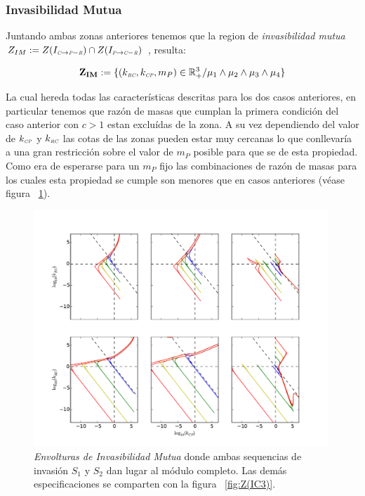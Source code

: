 \subsubsection{Invasibilidad Mutua}

Juntando ambas zonas anteriores tenemos que la region de \emph{invasibilidad mutua} $Z_{IM} := Z(I_{\textit{\tiny C} \to \textit{\tiny P}-\textit{\tiny R}}) \cap Z(I_{\textit{\tiny P} \to \textit{\tiny C}-\textit{\tiny R}})$ , resulta:

\begin{equation}
\mathbf{Z_{IM}} := \{ (k_{\textit{\tiny RC}},k_{\textit{\tiny CP}},m_P) \in \mathbb{R}^3_+ / \mu_1 \land \mu_2 \land \mu_3 \land \mu_4 \}
\end{equation}

La cual hereda todas las caracter\'isticas descritas para los dos casos anteriores, en particular tenemos que raz\'on de masas que cumplan la primera condici\'on del caso anterior con $c > 1$ estan exclu\'idas de la zona. A su vez dependiendo del valor de $k_{\textit{\tiny CP}}$ y $k_{\textit{\tiny RC}}$ las cotas de las zonas pueden estar muy cercanas lo que conllevar\'ia a una gran restricci\'on sobre el valor de $m_P$ posible para que se de esta propiedad. Como era de esperarse para un $m_P$ fijo las combinaciones de raz\'on de masas para los cuales esta propiedad se cumple son menores que en casos anteriores (v\'ease figura ~\ref{fig:MutualInv}).


\begin{figure}[!htbp]
  \centering
  \includegraphics[width = 0.99\textwidth]{./Plots/MutualInvAcGrGr.pdf}
  \caption[Env $I_M$]{\emph{Envolturas de Invasibilidad Mutua} donde ambas sequencias de invasi\'on $S_1$ y $S_2$ dan lugar al m\'odulo completo. Las dem\'as especificaciones se comparten con la figura ~\ref{fig:Z(IC3)}.}
  \label{fig:MutualInv}
\end{figure}

